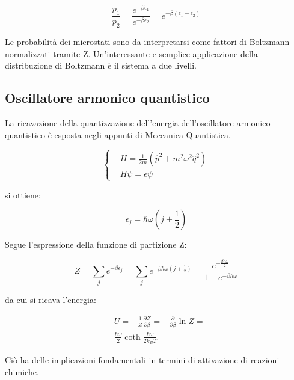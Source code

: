 \documentclass{article}
\begin{document}
\begin{equation}
    \frac{p_1}{p_2}=\frac{e^{-\beta \epsilon_1}}{e^{-\beta \epsilon_2}}=e^{-\beta(\epsilon_1-\epsilon_2)}
\end{equation}

Le probabilità dei microstati sono da interpretarsi come fattori di Boltzmann normalizzati tramite Z.
Un'interessante e semplice applicazione della distribuzione di Boltzmann è il sistema a due livelli.


\subsection{Oscillatore armonico quantistico}

La ricavazione della quantizzazione dell'energia dell'oscillatore armonico quantistico è esposta negli appunti di Meccanica Quantistica.

\begin{equation}
    \left\{
    \begin{aligned}
         & H=\frac{1}{2m}(\hat{p}^2+m^2\omega^2\hat{q}^2) \\
         & H\psi=\epsilon\psi
    \end{aligned}
    \right.
\end{equation}

si ottiene:

\begin{equation}
    \epsilon_j=\hbar\omega(j+\frac{1}{2})
\end{equation}

Segue l'espressione della funzione di partizione Z:

\begin{equation}
    Z=\sum_{j}e^{-\beta\epsilon_j}=\sum_{j}e^{-\beta\hbar\omega(j+\frac{1}{2})}=\frac{e^{-\frac{\beta\hbar\omega}{2}}}{1-e^{-\beta\hbar\omega}}
\end{equation}

da cui si ricava l'energia:


\begin{equation}
    \begin{aligned}
         & U=-\frac{1}{Z}\frac{\partial Z}{\partial \beta}= -\frac{\partial}{\partial \beta}\ln{Z}= \\
         & \frac{\hbar \omega}{2}\coth{\frac{\hbar \omega}{2k_BT}}
    \end{aligned}
\end{equation}

Ciò ha delle implicazioni fondamentali in termini di attivazione di reazioni chimiche.
\end{document}
